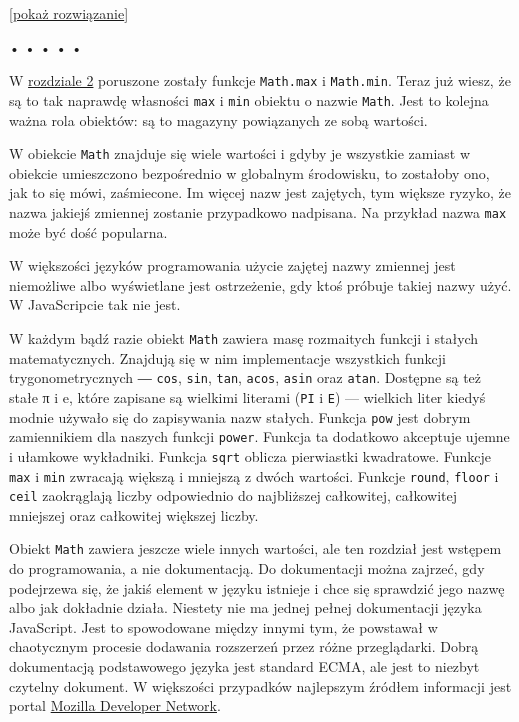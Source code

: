     
[\hyperref[sol:4.11]{pokaż rozwiązanie}]
    
    
  
  
\begin{center}
• • • • •
\end{center}
  
    
W \hyperref[chap:2]{rozdziale 2} poruszone zostały funkcje \texttt{Math.max} i \texttt{Math.min}. Teraz już wiesz, że są to tak naprawdę własności \texttt{max} i \texttt{min} obiektu o nazwie \texttt{Math}. Jest to kolejna ważna rola obiektów: są to magazyny powiązanych ze sobą wartości.

    
W obiekcie \texttt{Math} znajduje się wiele wartości i gdyby je wszystkie zamiast w obiekcie umieszczono bezpośrednio w globalnym środowisku, to zostałoby ono, jak to się mówi, zaśmiecone. Im więcej nazw jest zajętych, tym większe ryzyko, że nazwa jakiejś zmiennej zostanie przypadkowo nadpisana. Na przykład nazwa \texttt{max} może być dość popularna.

    
W większości języków programowania użycie zajętej nazwy zmiennej jest niemożliwe albo wyświetlane jest ostrzeżenie, gdy ktoś próbuje takiej nazwy użyć. W JavaScripcie tak nie jest.

    
W każdym bądź razie obiekt \texttt{Math} zawiera masę rozmaitych funkcji i stałych matematycznych. Znajdują się w nim implementacje wszystkich funkcji trygonometrycznych ― \texttt{cos}, \texttt{sin}, \texttt{tan}, \texttt{acos}, \texttt{asin} oraz \texttt{atan}. Dostępne są też stałe π i e, które zapisane są wielkimi literami (\texttt{PI} i \texttt{E}) — wielkich liter kiedyś modnie używało się do zapisywania nazw stałych. Funkcja \texttt{pow} jest dobrym zamiennikiem dla naszych funkcji \texttt{power}. Funkcja ta dodatkowo akceptuje ujemne i ułamkowe wykładniki. Funkcja \texttt{sqrt} oblicza pierwiastki kwadratowe. Funkcje \texttt{max} i \texttt{min} zwracają większą i mniejszą z dwóch wartości. Funkcje \texttt{round}, \texttt{floor} i \texttt{ceil} zaokrąglają liczby odpowiednio do najbliższej całkowitej, całkowitej mniejszej oraz całkowitej większej liczby.

    
Obiekt \texttt{Math} zawiera jeszcze wiele innych wartości, ale ten rozdział jest wstępem do programowania, a nie dokumentacją. Do dokumentacji można zajrzeć, gdy podejrzewa się, że jakiś element w języku istnieje i chce się sprawdzić jego nazwę albo jak dokładnie działa. Niestety nie ma jednej pełnej dokumentacji języka JavaScript. Jest to spowodowane między innymi tym, że powstawał w chaotycznym procesie dodawania rozszerzeń przez różne przeglądarki. Dobrą dokumentacją podstawowego języka jest standard ECMA, ale jest to niezbyt czytelny dokument. W większości przypadków najlepszym źródłem informacji jest portal \href{https://developer.mozilla.org/en/JavaScript/Reference/}{Mozilla Developer Network}.

